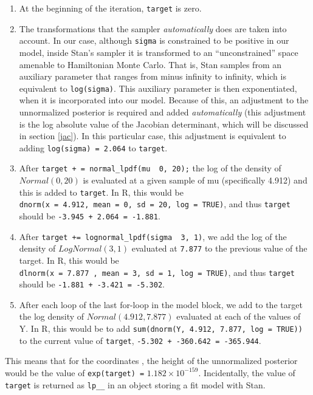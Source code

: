 \documentclass[12pt,]{krantz}
\providecommand{\tightlist}{%
  \setlength{\itemsep}{0pt}\setlength{\parskip}{0pt}}
\theoremstyle{definition}
\theoremstyle{definition}
\theoremstyle{definition}
\theoremstyle{remark}
\begin{document}
\begin{enumerate}
\def\labelenumi{\arabic{enumi}.}
\tightlist
\item
  At the beginning of the iteration, \texttt{target} is zero.
\item
  The transformations that the sampler \emph{automatically} does are
  taken into account. In our case, although \texttt{sigma} is
  constrained to be positive in our model, inside Stan's sampler it is
  transformed to an ``unconstrained'' space amenable to Hamiltonian
  Monte Carlo. That is, Stan samples from an auxiliary parameter that
  ranges from minus infinity to infinity, which is equivalent to
  \texttt{log(sigma)}. This auxiliary parameter is then exponentiated,
  when it is incorporated into our model. Because of this, an adjustment
  to the unnormalized posterior is required and added
  \emph{automatically} (this adjustment is the log absolute value of the
  Jacobian determinant, which will be discussed in section \ref{jac}).
  In this particular case, this adjustment is equivalent to adding
  \texttt{log(sigma)\ =\ 2.064} to \texttt{target}.
\item
  After \texttt{target\ +\ =\ normal\_lpdf(mu\ \textbar{}\ 0,\ 20);} the
  log of the density of \(Normal(0,20)\) is evaluated at a given sample
  of mu (specifically 4.912) and this is added to \texttt{target}. In R,
  this would be
  \texttt{dnorm(x\ =\ 4.912,\ mean\ =\ 0,\ sd\ =\ 20,\ log\ =\ TRUE)},
  and thus \texttt{target} should be
  \texttt{-3.945\ +\ 2.064\ =\ -1.881}.
\item
  After \texttt{target\ +=\ lognormal\_lpdf(sigma\ \textbar{}\ 3,\ 1)},
  we add the log of the density of \(LogNormal(3, 1)\) evaluated at
  \texttt{7.877} to the previous value of the target. In R, this would
  be
  \texttt{dlnorm(x\ =\ 7.877\ ,\ mean\ =\ 3,\ sd\ =\ 1,\ log\ =\ TRUE)},
  and thus \texttt{target} should be
  \texttt{-1.881\ +\ -3.421\ =\ -5.302}.
\item
  After each loop of the last for-loop in the model block, we add to the
  target the log density of \(Normal( 4.912, 7.877)\) evaluated at each
  of the values of Y. In R, this would be to add
  \texttt{sum(dnorm(Y,\ 4.912,\ 7.877,\ log\ =\ TRUE))} to the current
  value of \texttt{target}, \texttt{-5.302\ +\ -360.642\ =\ -365.944}.
\end{enumerate}

This means that for the coordinates , the height of the unnormalized
posterior would be the value of \texttt{exp(target)\ =}
\(\ensuremath{1.182\times 10^{-159}}\). Incidentally, the value of
\texttt{target} is returned as \texttt{lp\_\_} in an object storing a
fit model with Stan.
\end{document}
